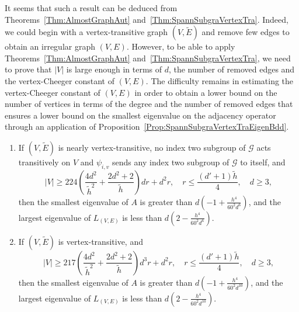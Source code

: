 \documentclass[ALCO,Unicode,published]{cedram}
\newcommand{\calG}{\ensuremath{\mathcal{G}}}
\begin{document}
It seems that such a result can be deduced from Theorems~\ref{Thm:AlmostGraphAut} and~\ref{Thm:SpannSubgraVertexTra}. Indeed, we could begin with a vertex-transitive graph $(V, \widetilde E)$ and remove few edges to obtain an irregular graph $(V, E)$. However, to be able to apply Theorems~\ref{Thm:AlmostGraphAut} and~\ref{Thm:SpannSubgraVertexTra}, we need to prove that $|V|$ is large enough in terms of $d$, the number of removed edges and the vertex-Cheeger constant of $(V, E)$. The difficulty remains in estimating the vertex-Cheeger constant of $(V, E)$ in order to obtain a lower bound on the number of vertices in terms of the degree and the number of removed edges that ensures a lower bound on the smallest eigenvalue on the adjacency operator through an application of Proposition~\ref{Prop:SpannSubgraVertexTraEigenBdd}. 

\medskip

\begin{theorem}
\label{Thm:Irregular}
\quad
\begin{enumerate}
\item 
If $(V, \widetilde E)$ is nearly vertex-transitive, no index two subgroup of $\calG$ acts transitively on $V$ and $\psi_{i, v}$ sends any index two subgroup of $\calG$ to itself, and 
$$
|V| 
 \geq 
224
\left( \frac{4d^2 }{\widetilde h^2} + \frac{2d^2 + 2}{\widetilde h}\right)dr + d^{2}r
, \quad
r \leq \frac{(d'+1)\widetilde h}4, \quad 
d \geq 3,
$$
then the smallest eigenvalue of $A$ is greater than $d \left(-1 + \frac{h^4 }{60^2 d^{6}}\right)
$, and the largest eigenvalue of $L_{(V, E)}$ is less than $d \left(2 -  \frac{h^4 }{60^2 d^{6}}\right)
$. 

\item 
If $(V, \widetilde E)$ is vertex-transitive, and  
$$
|V| 
 \geq 
217
\left( \frac{4d^2 }{\widetilde h^2} + \frac{2d^2 + 2}{\widetilde h}\right)d^3 r + d^2r, \quad
r \leq \frac{(d'+1)\widetilde h}4, \quad 
d \geq 3,
$$
then the smallest eigenvalue of $A$ is greater than $ d \left(-1 + \frac{h^4 }{60^2 d^{10}}\right)
$, and the largest eigenvalue of $L_{(V, E)}$ is less than $d \left(2 -  \frac{h^4 }{60^2 d^{10}}\right)
$. 
\end{enumerate}
\end{theorem}
\end{document}
